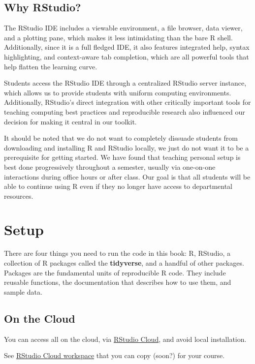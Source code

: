 \documentclass[]{book}
\theoremstyle{definition}
\theoremstyle{definition}
\theoremstyle{definition}
\theoremstyle{remark}
\begin{document}
\section{Why RStudio?}\label{why-rstudio}

The RStudio IDE includes a viewable environment, a file browser, data
viewer, and a plotting pane, which makes it less intimidating than the
bare R shell. Additionally, since it is a full fledged IDE, it also
features integrated help, syntax highlighting, and context-aware tab
completion, which are all powerful tools that help flatten the learning
curve.

Students access the RStudio IDE through a centralized RStudio server
instance, which allows us to provide students with uniform computing
environments. Additionally, RStudio's direct integration with other
critically important tools for teaching computing best practices and
reproducible research also influenced our decision for making it central
in our toolkit.

It should be noted that we do not want to completely dissuade students
from downloading and installing R and RStudio locally, we just do not
want it to be a prerequisite for getting started. We have found that
teaching personal setup is best done progressively throughout a
semester, usually via one-on-one interactions during office hours or
after class. Our goal is that all students will be able to continue
using R even if they no longer have access to departmental resources.

\chapter{Setup}\label{setup}

There are four things you need to run the code in this book: R, RStudio,
a collection of R packages called the \textbf{tidyverse}, and a handful
of other packages. Packages are the fundamental units of reproducible R
code. They include reusable functions, the documentation that describes
how to use them, and sample data.

\section{On the Cloud}\label{on-the-cloud}

You can access all on the cloud, via
\href{http://rstudio.cloud/}{RStudio Cloud}, and avoid local
installation.

See \href{https://rstudio.cloud/spaces/1655/projects}{RStudio Cloud
workspace} that you can copy (soon?) for your course.
\end{document}
